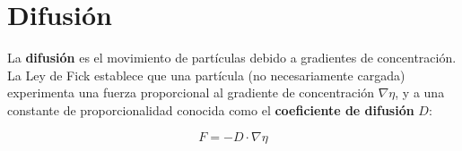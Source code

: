 









\newpage
\section{Difusión}

La \textbf{difusión} es el movimiento de partículas debido a gradientes de concentración. La Ley de Fick establece que una partícula (no necesariamente cargada) experimenta una fuerza proporcional al gradiente de concentración $\nabla \eta$, y a una constante de proporcionalidad conocida como el \textbf{coeficiente de difusión} $D$:

\[ F = -D \cdot \nabla \eta \]

